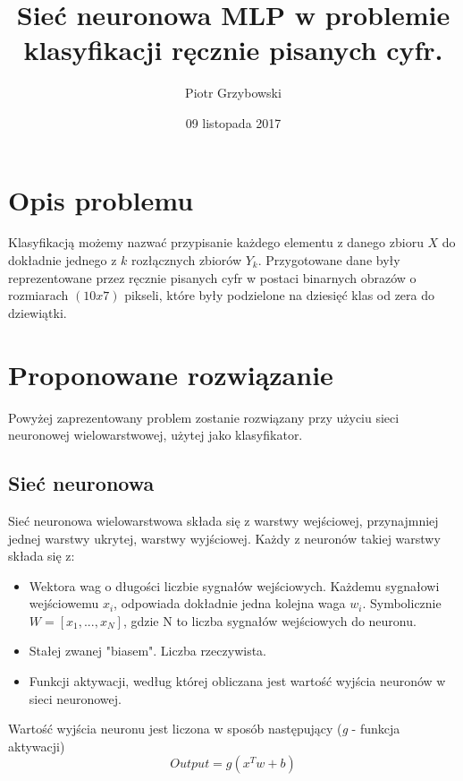 \documentclass{article}
\title{Sieć neuronowa MLP w problemie klasyfikacji ręcznie pisanych cyfr.}
\date{09 listopada 2017}
\author{Piotr Grzybowski}
\begin{document}
 
\maketitle
\newpage

\section{Opis problemu}
	Klasyfikacją możemy nazwać przypisanie każdego elementu z danego zbioru $X$ do dokładnie jednego z $k$ rozłącznych zbiorów $Y_k$. Przygotowane dane były reprezentowane przez ręcznie pisanych cyfr w postaci binarnych obrazów o rozmiarach $(10x7)$ pikseli, które były podzielone na dziesięć klas od zera do dziewiątki.
    
    
\section{Proponowane rozwiązanie}
	Powyżej zaprezentowany problem zostanie rozwiązany przy użyciu sieci neuronowej wielowarstwowej, użytej jako klasyfikator. 
	\subsection{Sieć neuronowa}
	Sieć neuronowa wielowarstwowa składa się z warstwy wejściowej, przynajmniej jednej warstwy ukrytej, warstwy wyjściowej. Każdy z neuronów takiej warstwy składa się z:
	\begin{itemize}
		\item Wektora wag o długości liczbie sygnałów wejściowych. Każdemu sygnałowi wejściowemu $x_i$, odpowiada dokładnie jedna kolejna waga $w_i$. Symbolicznie $W = [x_1, ..., x_N]$, gdzie N to liczba sygnałów wejściowych do neuronu.
		\item Stałej zwanej "biasem". Liczba rzeczywista.
		\item Funkcji aktywacji, według której obliczana jest wartość wyjścia neuronów w sieci neuronowej.
	\end{itemize}
    Wartość wyjścia neuronu jest liczona w sposób następujący (\textit{g} - funkcja aktywacji)
    \begin{equation}
    		Output = g(x^Tw + b)
    \end{equation}
    
\end{document}
